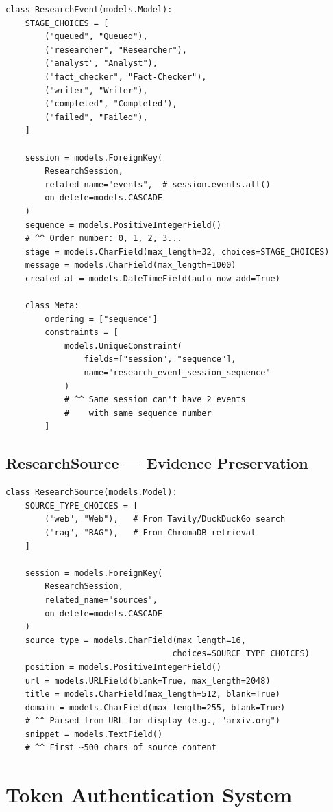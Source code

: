 \documentclass[11pt,a4paper,twoside]{report}
\begin{document}
\begin{lstlisting}[style=pythonstyle]
class ResearchEvent(models.Model):
    STAGE_CHOICES = [
        ("queued", "Queued"),
        ("researcher", "Researcher"),
        ("analyst", "Analyst"),
        ("fact_checker", "Fact-Checker"),
        ("writer", "Writer"),
        ("completed", "Completed"),
        ("failed", "Failed"),
    ]

    session = models.ForeignKey(
        ResearchSession,
        related_name="events",  # session.events.all()
        on_delete=models.CASCADE
    )
    sequence = models.PositiveIntegerField()
    # ^^ Order number: 0, 1, 2, 3...
    stage = models.CharField(max_length=32, choices=STAGE_CHOICES)
    message = models.CharField(max_length=1000)
    created_at = models.DateTimeField(auto_now_add=True)

    class Meta:
        ordering = ["sequence"]
        constraints = [
            models.UniqueConstraint(
                fields=["session", "sequence"],
                name="research_event_session_sequence"
            )
            # ^^ Same session can't have 2 events
            #    with same sequence number
        ]
\end{lstlisting}

\subsection{ResearchSource --- Evidence Preservation}

\begin{lstlisting}[style=pythonstyle]
class ResearchSource(models.Model):
    SOURCE_TYPE_CHOICES = [
        ("web", "Web"),   # From Tavily/DuckDuckGo search
        ("rag", "RAG"),   # From ChromaDB retrieval
    ]

    session = models.ForeignKey(
        ResearchSession,
        related_name="sources",
        on_delete=models.CASCADE
    )
    source_type = models.CharField(max_length=16,
                                  choices=SOURCE_TYPE_CHOICES)
    position = models.PositiveIntegerField()
    url = models.URLField(blank=True, max_length=2048)
    title = models.CharField(max_length=512, blank=True)
    domain = models.CharField(max_length=255, blank=True)
    # ^^ Parsed from URL for display (e.g., "arxiv.org")
    snippet = models.TextField()
    # ^^ First ~500 chars of source content
\end{lstlisting}

\section{Token Authentication System}
\end{document}
